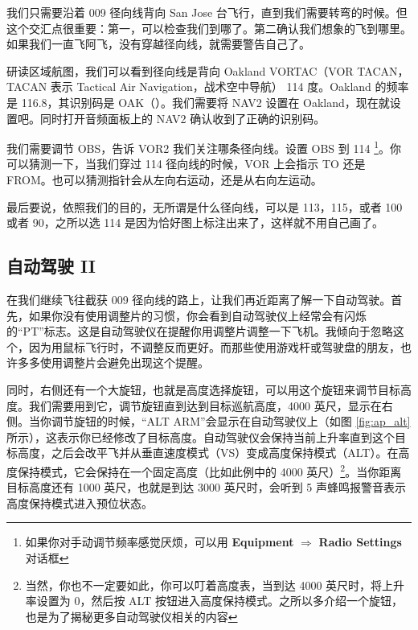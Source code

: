 我们只需要沿着 009 径向线背向 San Jose 台飞行，直到我们需要转弯的时候。但这个交汇点很重要：第一，可以检查我们到哪了。第二确认我们想象的飞到哪里。如果我们一直飞阿飞，没有穿越径向线，就需要警告自己了。

研读区域航图，我们可以看到径向线是背向 Oakland VORTAC（VOR TACAN，TACAN 表示 Tactical Air Navigation，战术空中导航） 114 度。Oakland 的频率是 116.8，其识别码是 OAK（\mdash\mdash\mdash\mspace \mdot\mdash\mspace \mdash\mdot\mdash）。我们需要将 NAV2 设置在 Oakland，现在就设置吧。同时打开音频面板上的 NAV2 确认收到了正确的识别码。

我们需要调节 OBS，告诉 VOR2 我们关注哪条径向线。设置 OBS 到 114 \footnote{如果你对手动调节频率感觉厌烦，可以用 \textbf{\textsf{Equipment}} $\Rightarrow$ \textbf{\textsf{Radio Settings}} 对话框}。你可以猜测一下，当我们穿过 114 径向线的时候，VOR 上会指示 TO 还是 FROM。也可以猜测指针会从左向右运动，还是从右向左运动。

最后要说，依照我们的目的，无所谓是什么径向线，可以是 113，115，或者 100 或者 90，之所以选 114 是因为恰好图上标注出来了，这样就不用自己画了。

\subsection{自动驾驶 II}

在我们继续飞往截获 009 径向线的路上，让我们再近距离了解一下自动驾驶。首先，如果你没有使用调整片的习惯，你会看到自动驾驶仪上经常会有闪烁的“PT”标志。这是自动驾驶仪在提醒你用调整片调整一下飞机。我倾向于忽略这个，因为用鼠标飞行时，不调整反而更好。而那些使用游戏杆或驾驶盘的朋友，也许多多使用调整片会避免出现这个提醒。

同时，右侧还有一个大旋钮，也就是高度选择旋钮，可以用这个旋钮来调节目标高度。我们需要用到它，调节旋钮直到达到目标巡航高度，4000 英尺，显示在右侧。当你调节旋钮的时候，“ALT ARM”会显示在自动驾驶仪上（如图 \ref{fig:ap_alt} 所示），这表示你已经修改了目标高度。自动驾驶仪会保持当前上升率直到这个目标高度，之后会改平飞并从垂直速度模式（VS）变成高度保持模式（ALT）。在高度保持模式，它会保持在一个固定高度（比如此例中的 4000 英尺）\footnote{当然，你也不一定要如此，你可以叮着高度表，当到达 4000 英尺时，将上升率设置为 0，然后按 ALT 按钮进入高度保持模式。之所以多介绍一个旋钮，也是为了揭秘更多自动驾驶仪相关的内容}。当你距离目标高度还有 1000 英尺，也就是到达 3000 英尺时，会听到 5 声蜂鸣报警音表示高度保持模式进入预位状态。

